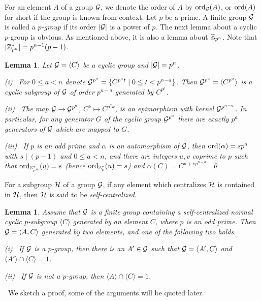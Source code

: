 \documentclass{article}
\newtheorem{lemma}[theorem]{Lemma}
\numberwithin{equation}{section}
\def\pf{\noindent{\bf Proof.}~}
\begin{document}
For an element $A$ of a group ${\cal G}$, we denote the order of $A$
by ${\rm ord}_{\cal G}(A)$, or ${\rm ord}(A)$ for short 
if the group is known from context.
Let $p$ be a prime. A finite group ${\cal G}$ is called a {\em $p$-group}
if its order $|{\cal G}|$ is a power of $p$.
The next lemma about a cyclic $p$-group is obvious.
As mentioned above, it is also a lemma about ${\Bbb Z}_{p^n}$.
Note that $|{\Bbb Z}_{p^n}^*|=p^{n-1}(p-1)$.

\begin{lemma} \label{p-cyclic}
Let ${\cal G}=\langle C\rangle$ be a cyclic group and
$|{\cal G}|=p^n$.

(i)~ For $0\le a<n$ denote ${\cal G}^{p^a}=\{C^{p^a t}\mid 0\le t<p^{n-a}\}$.
Then ${\cal G}^{p^a}=\langle C^{p^a}\rangle$
is a cyclic subgroup of ${\cal G}$ of order $p^{n-a}$ generated by $C^{p^a}$.

(ii)~ The map ${\cal G}\to{\cal G}^{p^a}$, $C^k\mapsto C^{p^a k}$,
is an epimorphism with kernel ${\cal G}^{p^{n-a}}$.
In particular,  for any generator $G$ of the cyclic group ${\cal G}^{p^a}$
there are exactly $p^{a}$ generators of ${\cal G}$ which are mapped to $G$.

(iii)~ If $p$ is an odd prime and $\alpha$ is an automorphism of ${\cal G}$,
then ${\rm ord}(\alpha)=sp^a$ with $s\mid (p-1)$ and $0\le a<n$,
and there are integers $u,v$ coprime to $p$ such that
${\rm ord}_{{\Bbb Z}_{p^n}^*}(u)=s$ 
(hence ${\rm ord}_{{\Bbb Z}_{p}^*}(u)=s$)
and $\alpha(C)=C^{u+vp^{n-a}}$.
\qed
\end{lemma}

For a subgroup ${\cal H}$ of a group ${\cal G}$,
if any element which centralizes ${\cal H}$ is contained in
${\cal H}$, then ${\cal H}$ is said to be {\em self-centralized}.

\begin{lemma} \label{split}
Assume that ${\cal G}$ is a finite group
containing a self-centralized normal cyclic $p$-subgroup $\langle C\rangle$
generated by an element $C$, where $p$ is an odd prime.
Then ${\cal G}=\langle A,C\rangle$ generated by two elements, and
one of the following two holds.

(i)~ If ${\cal G}$ is a $p$-group, then there is an
$A'\in{\cal G}$ such that ${\cal G}=\langle A',C\rangle$ and
$\langle A'\rangle\cap\langle C\rangle=1$.

(ii)~ If ${\cal G}$ is not a $p$-group, then
$\langle A\rangle\cap\langle C\rangle=1$.
\end{lemma}

\pf We sketch a proof, some of the arguments will be quoted later. 
\end{document}
